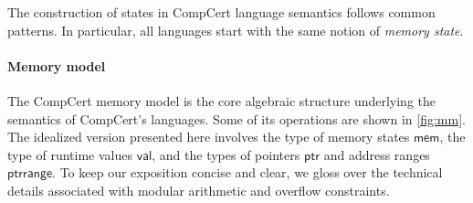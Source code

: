 \documentclass[sigplan,10pt,review]{acmart}
\newcommand{\kw}[1]{\ensuremath{ \mathsf{#1} }}
\begin{document}
%

The construction of states in CompCert language semantics
follows common patterns.
In particular,
all languages start with
the same notion of \emph{memory state}.


\paragraph{Memory model} \label{sec:sem:mm} %

The CompCert memory model \cite{compcertmm,compcertmmv2}
is the core algebraic structure
underlying the semantics of CompCert's languages.
Some of its operations
are shown in \autoref{fig:mm}.
The idealized version presented here
involves
the type of memory states \kw{mem},
the type of runtime values \kw{val}, and
the types of pointers \kw{ptr} and address ranges \kw{ptrrange}.
To keep our exposition concise and clear,
we gloss over the technical details
associated with modular arithmetic and overflow constraints.
\end{document}
